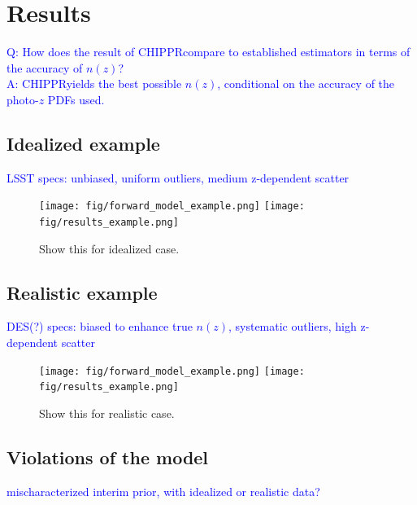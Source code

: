 \documentclass[iop]{emulateapj}
\newcommand{\chippr}{CHIPPR}
\begin{document}
\section{Results}
\label{sec:results}

\textcolor{blue}{Q: How does the result of \chippr compare to established 
estimators in terms of the accuracy of $n(z)$?\\
A: \chippr yields the best possible $n(z)$, conditional on the accuracy of the 
photo-$z$ PDFs used.}

\subsection{Idealized example}
\label{sec:idealized}

\textcolor{blue}{LSST specs: unbiased, uniform outliers, medium z-dependent 
scatter}

\begin{figure}
	\begin{center}
		
\texttt{[image: fig/forward\_model\_example.png]}
		\texttt{[image: fig/results\_example.png]}
		\caption{Show this for idealized case.}
		\label{fig:idealized}
	\end{center}
\end{figure}

\subsection{Realistic example}
\label{sec:realistic}

\textcolor{blue}{DES(?) specs: biased to enhance true $n(z)$, systematic 
outliers, high z-dependent scatter}

\begin{figure}
	\begin{center}
		
\texttt{[image: fig/forward\_model\_example.png]}
		\texttt{[image: fig/results\_example.png]}
		\caption{Show this for realistic case.}
		\label{fig:realistic}
	\end{center}
\end{figure}

\subsection{Violations of the model}
\label{sec:violations}

\textcolor{blue}{mischaracterized interim prior, with idealized or realistic 
data?}
\end{document}
